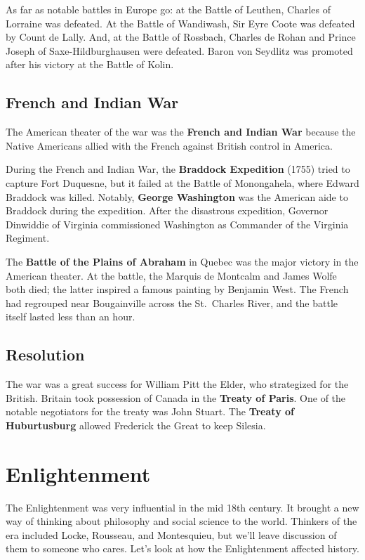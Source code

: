 As far as notable battles in Europe go: at the Battle of Leuthen, Charles of Lorraine was defeated.
At the Battle of Wandiwash, Sir Eyre Coote was defeated by Count de Lally.
And, at the Battle of Rossbach,
Charles de Rohan and Prince Joseph of Saxe-Hildburghausen were defeated.
Baron von Seydlitz was promoted after his victory at the Battle of Kolin.

\subsection*{French and Indian War}

The American theater of the war was the \textbf{French and Indian War}
because the Native Americans allied with the French against British control in America.

During the French and Indian War,
the \textbf{Braddock Expedition} (1755) tried to capture Fort Duquesne,
but it failed at the Battle of Monongahela, where Edward Braddock was killed.
Notably, \textbf{George Washington} was the American aide to Braddock during the expedition.
After the disastrous expedition,
Governor Dinwiddie of Virginia commissioned Washington as Commander of the Virginia Regiment.

The \textbf{Battle of the Plains of Abraham}
in Quebec was the major victory in the American theater.
At the battle, the Marquis de Montcalm and James Wolfe both died;
the latter inspired a famous painting by Benjamin West.
The French had regrouped near Bougainville across the St.\ Charles River,
and the battle itself lasted less than an hour.

\subsection*{Resolution}

The war was a great success for William Pitt the Elder, who strategized for the British.
Britain took possession of Canada in the \textbf{Treaty of Paris}.
One of the notable negotiators for the treaty was John Stuart.
The \textbf{Treaty of Huburtusburg} allowed Frederick the Great to keep Silesia.

\section{Enlightenment}

The Enlightenment was very influential in the mid 18th century.
It brought a new way of thinking about philosophy and social science to the world.
Thinkers of the era included Locke, Rousseau, and Montesquieu,
but we'll leave discussion of them to someone who cares.
Let's look at how the Enlightenment affected history.

